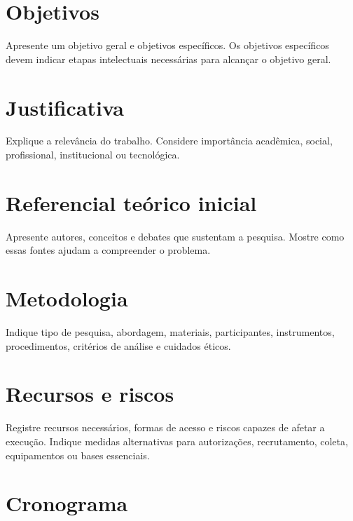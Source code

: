\section{Objetivos}

Apresente um objetivo geral e objetivos específicos. Os objetivos específicos devem indicar etapas intelectuais necessárias para alcançar o objetivo geral.

\section{Justificativa}

Explique a relevância do trabalho. Considere importância acadêmica, social, profissional, institucional ou tecnológica.

\section{Referencial teórico inicial}

Apresente autores, conceitos e debates que sustentam a pesquisa. Mostre como essas fontes ajudam a compreender o problema.

\section{Metodologia}

Indique tipo de pesquisa, abordagem, materiais, participantes, instrumentos, procedimentos, critérios de análise e cuidados éticos.

\section{Recursos e riscos}

Registre recursos necessários, formas de acesso e riscos capazes de afetar a execução. Indique medidas alternativas para autorizações, recrutamento, coleta, equipamentos ou bases essenciais.

\section{Cronograma}

